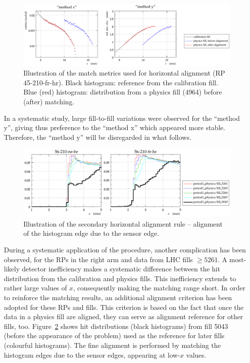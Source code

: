\documentclass[TOTEM]{cern/cernphprep}
\begin{document}
\begin{figure}[h!]
\begin{center}
\includegraphics[width=1\hsize]{fig/physics_fills/match_method_example.pdf}
\caption{%
Illustration of the match metrics used for horizontal alignment (RP 45-210-fr-hr). Black histogram: reference from the calibration fill. Blue (red) histogram: distribution from a physics fill (4964) before (after) matching.
}
\label{fig:hor_match_method}
\end{center}
\end{figure}

In a systematic study, large fill-to-fill variations were observed for the ``method y'', giving thus preference to the ``method x'' which appeared more stable. Therefore, the ``method y'' will be disregarded in what follows.

\begin{figure}[h!]
\begin{center}
\includegraphics[width=0.9\hsize]{fig/physics_fills/x_alignment_secondary_method.pdf}
\caption{%
Illustration of the secondary horizontal alignment rule -- alignment of the histogram edge due to the sensor edge.
}
\label{fig:hor_secondary_method}
\end{center}
\end{figure}

During a systematic application of the procedure, another complication has been observed, for the RPs in the right arm and data from LHC fills $\ge 5261$. A most-likely detector inefficiency makes a systematic difference between the hit distribution from the calibration and physics fills. This inefficiency extends to rather large values of $x$, consequently making the matching range short. In order to reinforce the matching results, an additional alignment criterion has been adopted for these RPs and fills. This criterion is based on the fact that once the data in a physics fill are aligned, they can serve as alignment reference for other fills, too. Figure~\ref{fig:hor_secondary_method} shows hit distributions (black histograms) from fill 5043 (before the appearance of the problem) used as the reference for later fills (colourful histograms). The fine alignment is performed by matching the histogram edges due to the sensor edges, appearing at low-$x$ values.
\end{document}
